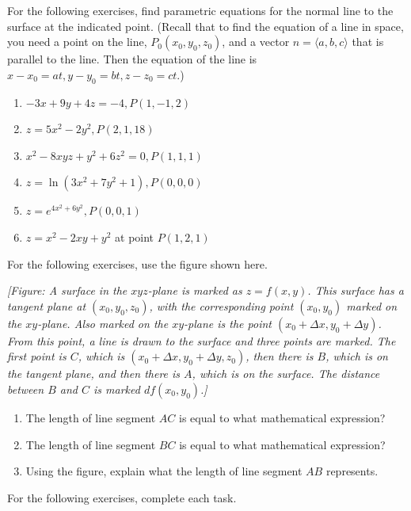 \documentclass{exercises}
\begin{document}
For the following exercises, find parametric equations for the normal line to the surface at the indicated point. (Recall that to find the equation of a line in space, you need a point on the line, $P_{0}(x_{0},y_{0},z_{0})$, and a vector $n=\langle a,b,c\rangle$ that is parallel to the line. Then the equation of the line is $x-x_{0}=at,y-y_{0}=bt,z-z_{0}=ct$.)

\begin{enumerate}[resume]
\item $-3x+9y+4z=-4,P(1,-1,2)$
\item $z=5x^{2}-2y^{2},P(2,1,18)$
\item $x^{2}-8xyz+y^{2}+6z^{2}=0,P(1,1,1)$
\item $z=\ln(3x^{2}+7y^{2}+1),P(0,0,0)$
\item $z=e^{4x^{2}+6y^{2}},P(0,0,1)$
\item $z=x^{2}-2xy+y^{2}$ at point $P(1,2,1)$
\end{enumerate}

For the following exercises, use the figure shown here.


\textit{[Figure: A surface in the $xyz$-plane is marked as $z=f(x,y)$. This surface has a tangent plane at $(x_{0},y_{0},z_{0})$, with the corresponding point $(x_{0},y_{0})$ marked on the $xy$-plane. Also marked on the $xy$-plane is the point $(x_{0}+\Delta x,y_{0}+\Delta y)$. From this point, a line is drawn to the surface and three points are marked. The first point is $C$, which is $(x_{0}+\Delta x,y_{0}+\Delta y,z_{0})$, then there is $B$, which is on the tangent plane, and then there is $A$, which is on the surface. The distance between $B$ and $C$ is marked $df(x_{0},y_{0})$.]}

\begin{enumerate}[resume]
\item The length of line segment $AC$ is equal to what mathematical expression?
\item The length of line segment $BC$ is equal to what mathematical expression?
\item Using the figure, explain what the length of line segment $AB$ represents.
\end{enumerate}

For the following exercises, complete each task.
\end{document}

